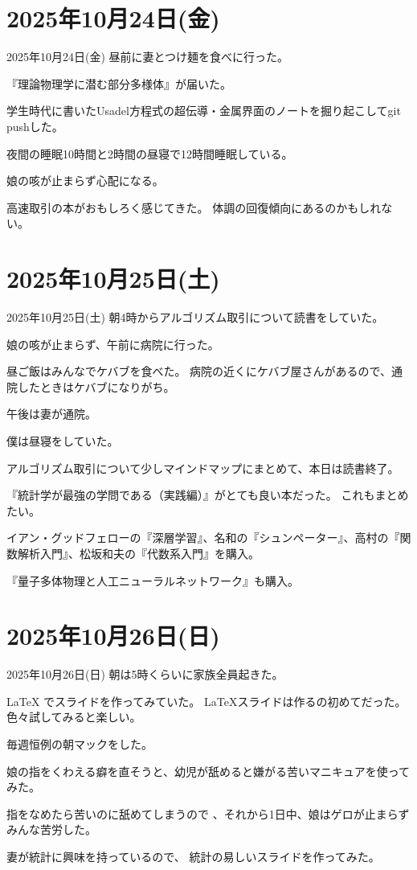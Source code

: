 \documentclass[dvipdfmx, autodetect-engine, aspectratio=169, 10.5pt]{beamer}
\begin{document}
\section{2025年10月24日(金)}

\begin{frame}{2025年10月24日(金)}
昼前に妻とつけ麺を食べに行った。

『理論物理学に潜む部分多様体』が届いた。

学生時代に書いたUsadel方程式の超伝導・金属界面のノートを掘り起こしてgit pushした。

夜間の睡眠10時間と2時間の昼寝で12時間睡眠している。

娘の咳が止まらず心配になる。

高速取引の本がおもしろく感じてきた。
体調の回復傾向にあるのかもしれない。
\end{frame}

\section{2025年10月25日(土)}

\begin{frame}{2025年10月25日(土)}
朝4時からアルゴリズム取引について読書をしていた。

娘の咳が止まらず、午前に病院に行った。

昼ご飯はみんなでケバブを食べた。
病院の近くにケバブ屋さんがあるので、通院したときはケバブになりがち。

午後は妻が通院。

僕は昼寝をしていた。

アルゴリズム取引について少しマインドマップにまとめて、本日は読書終了。

『統計学が最強の学問である（実践編）』がとても良い本だった。
これもまとめたい。

イアン・グッドフェローの『深層学習』、名和の『シュンペーター』、高村の『関数解析入門』、松坂和夫の『代数系入門』を購入。

『量子多体物理と人工ニューラルネットワーク』も購入。
\end{frame}

\section{2025年10月26日(日)}

\begin{frame}{2025年10月26日(日)}
朝は5時くらいに家族全員起きた。

LaTeX でスライドを作ってみていた。
LaTeXスライドは作るの初めてだった。
色々試してみると楽しい。

毎週恒例の朝マックをした。

娘の指をくわえる癖を直そうと、幼児が舐めると嫌がる苦いマニキュアを使ってみた。

指をなめたら苦いのに舐めてしまうので 、それから1日中、娘はゲロが止まらずみんな苦労した。

妻が統計に興味を持っているので、 統計の易しいスライドを作ってみた。
\end{frame}
\end{document}
